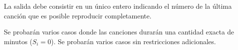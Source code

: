 \documentclass{oci}
\begin{document}
\begin{outputDescription}
  La salida debe consistir en un único entero indicando el número 
  de la última canción que es posible reproducir completamente.
\end{outputDescription}

\begin{scoreDescription}
   Se probarán varios casos donde las canciones durarán una cantidad
  exacta de minutos ($S_i = 0$).
   Se probarán varios casos sin restricciones adicionales. 
\end{scoreDescription}

\begin{sampleDescription}
\end{sampleDescription}
\end{document}
